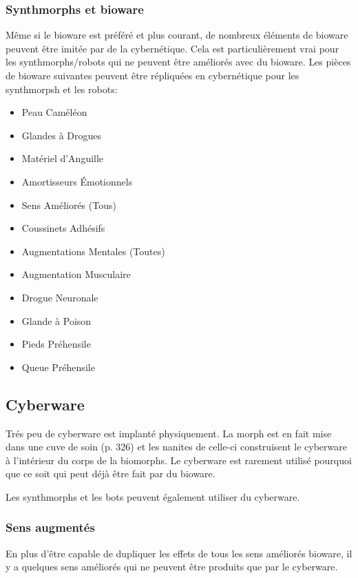 \subsubsection{Synthmorphs et bioware} 

Même si le bioware est préféré et plus courant, de nombreux éléments de bioware peuvent être imitée par de la cybernétique. Cela est particulièrement vrai pour les synthmorphs/robots qui ne peuvent être améliorés avec du bioware. Les pièces de bioware suivantes peuvent être répliquées en cybernétique pour les synthmorpsh et les robots: 

\begin{itemize} \item Peau Caméléon \item Glandes à Drogues \item Matériel d'Anguille \item Amortisseurs Émotionnels \item Sens Améliorés (Tous) \item Coussinets Adhésifs \item Augmentations Mentales (Toutes) \item Augmentation Musculaire \item Drogue Neuronale \item Glande à Poison \item Pieds Préhensile \item Queue Préhensile \end{itemize} 

\subsection{Cyberware} \label{sec:cyberware} 

Trés peu de cyberware est implanté physiquement. La morph est en fait mise dans une cuve de soin (p. 326) et les nanites de celle-ci construisent le cyberware à l'intérieur du corps de la biomorphs. Le cyberware est rarement utilisé pourquoi que ce soit qui peut déjà être fait par du bioware. 

Les synthmorphs et les bots peuvent également utiliser du cyberware. 

\subsubsection{Sens augmentés} 

En plus d'être capable de dupliquer les effets de tous les sens améliorés bioware, il y a quelques sens améliorés qui ne peuvent être produits que par le cyberware. 

